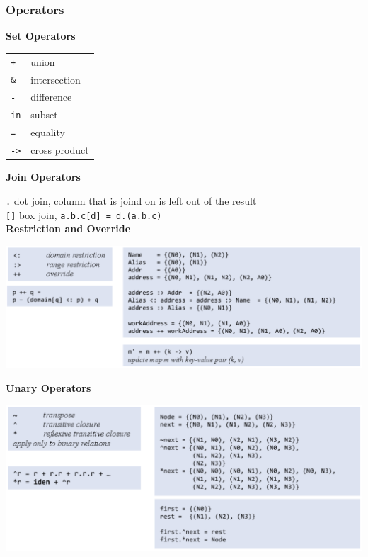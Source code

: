 \subsubsection{Operators}

\textbf{Set Operators}
\begin{center}
	\begin{tabular}{l l}
  		\texttt{+} & union \\
  		\texttt{\&} & intersection \\
  		\texttt{-} & difference \\
  		\texttt{in} & subset \\
  		\texttt{=} & equality \\
  		\texttt{->} & cross product
	\end{tabular}
\end{center}

\textbf{Join Operators}

\texttt{.}  dot join, column that is joind on is left out of the result\\
\texttt{[]} box join, \texttt{a.b.c[d] = d.(a.b.c)}\\

\textbf{Restriction and Override}
\begin{center}
	\includegraphics[width=\columnwidth]{assets/restriction}
\end{center}

\vspace{-8pt}
\textbf{Unary Operators}
\begin{center}
	\includegraphics[width=\columnwidth]{assets/unary}
\end{center}

